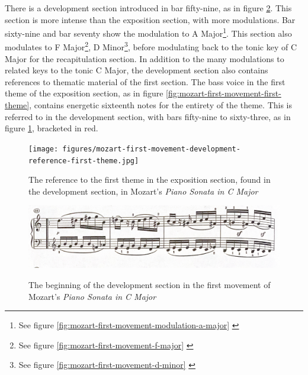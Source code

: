There is a development section introduced in bar fifty-nine, as in figure \ref{fig:mozart-first-movement-development-start}\autocite{Henle_1977}. This section is more intense than the exposition section, with more modulations. Bar sixty-nine and bar seventy show the modulation to A Major\footnote{See figure \ref{fig:mozart-first-movement-modulation-a-major} \citeauthor{Henle_1977}}. This section also modulates to F Major\footnote{See figure \ref{fig:mozart-first-movement-f-major} \citeauthor{Henle_1977}}, D Minor\footnote{See figure \ref{fig:mozart-first-movement-d-minor} \citeauthor{Henle_1977}}, before modulating back to the tonic key of C Major for the recapitulation section. In addition to the many modulations to related keys to the tonic C Major, the development section also contains references to thematic material of the first section. The bass voice in the first theme of the exposition section, as in figure \ref{fig:mozart-first-movement-first-theme}\autocite{Henle_1977}, contains energetic sixteenth notes for the entirety of the theme. This is referred to in the development section, with bars fifty-nine to sixty-three, as in figure \ref{fig:mozart-first-movement-development-reference-first-theme}\autocite{Henle_1977}, bracketed in red. 

\begin{figure}
    \centering
    \texttt{[image: figures/mozart-first-movement-development-reference-first-theme.jpg]}
    \caption{The reference to the first theme in the exposition section, found in the development section, in Mozart's \textit{Piano Sonata in C Major}}
    \label{fig:mozart-first-movement-development-reference-first-theme}
\end{figure}

\begin{figure}
    \centering
    \includegraphics[width=\textwidth]{figures/mozart-first-movement-development-start.jpg}
    \caption{The beginning of the development section in the first movement of Mozart's \textit{Piano Sonata in C Major}}\autocite{Henle_1977}
    \label{fig:mozart-first-movement-development-start}
\end{figure}

